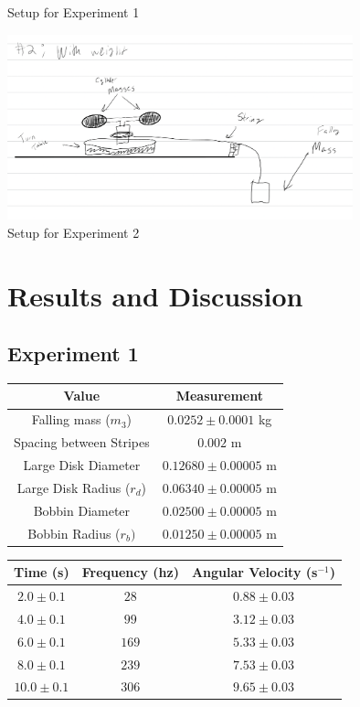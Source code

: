 \documentclass[9pt]{extarticle}
\begin{document}
{\begin{center}
	Setup for Experiment 1
\end{center}
\begin{center}
	\includegraphics[width=10cm]{Lab8Image3_2.png} \\
	Setup for Experiment 2
\end{center}
\section*{Results and Discussion}
\subsection*{Experiment 1}

\begin{center}
	\renewcommand{\arraystretch}{1.5}
	\begin{tabular}{c|c}
		Value & Measurement \\
		\hline
		Falling mass ($m_3$) & $0.0252\pm 0.0001$ kg\\
		Spacing between Stripes & $0.002$ m \\
		Large Disk Diameter  & $0.12680\pm 0.00005$ m\\
		Large Disk Radius ($r_{d}$)& $0.06340\pm 0.00005$ m \\
		Bobbin Diameter & $0.02500\pm 0.00005$ m \\
		Bobbin Radius ($r_{b})$& $0.01250\pm 0.00005$ m
	\end{tabular}
\end{center}

\begin{center}
	\renewcommand{\arraystretch}{1.5}
	\begin{tabular}{c|c|c}
	 Time (s) & Frequency (hz) & Angular Velocity (s$^{-1}$) \\
	 \hline
	 $2.0\pm 0.1$ & $28$ & $0.88\pm 0.03$\\
	 $4.0\pm 0.1$ & $99$ & $3.12\pm 0.03$\\
	 $6.0\pm 0.1$ & $169$ & $5.33\pm 0.03$\\
	 $8.0\pm 0.1$ & $239$ & $7.53\pm 0.03$\\
	 $10.0\pm 0.1$ & $306$ & $9.65\pm 0.03$
	\end{tabular}
\end{center}

}
\end{document}
